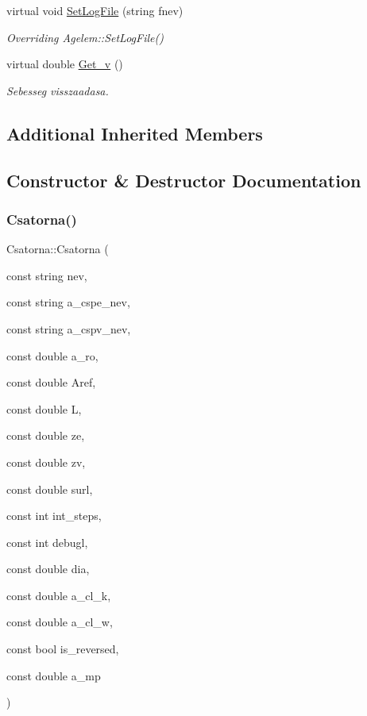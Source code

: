 \begin{DoxyCompactItemize}
virtual void \hyperlink{class_csatorna_a0b0b43ad04feb2e0cf60a6d027387ff9}{Set\+Log\+File} (string fnev)
\begin{DoxyCompactList}\small\item\em Overriding Agelem\+::\+Set\+Log\+File() \end{DoxyCompactList}\item 
\hypertarget{class_csatorna_a74db8402dcaaf02c408c1ac900a610f9}{}\label{class_csatorna_a74db8402dcaaf02c408c1ac900a610f9} 
virtual double \hyperlink{class_csatorna_a74db8402dcaaf02c408c1ac900a610f9}{Get\+\_\+v} ()
\begin{DoxyCompactList}\small\item\em Sebesseg visszaadasa. \end{DoxyCompactList}\end{DoxyCompactItemize}
\subsection*{Additional Inherited Members}


\subsection{Constructor \& Destructor Documentation}
\hypertarget{class_csatorna_ae3829a74761e0507363290fde29af12b}{}\label{class_csatorna_ae3829a74761e0507363290fde29af12b} 
\subsubsection{\texorpdfstring{Csatorna()}{Csatorna()}}
{\footnotesize\ttfamily Csatorna\+::\+Csatorna (\begin{DoxyParamCaption}\item[{const string}]{nev,  }\item[{const string}]{a\+\_\+cspe\+\_\+nev,  }\item[{const string}]{a\+\_\+cspv\+\_\+nev,  }\item[{const double}]{a\+\_\+ro,  }\item[{const double}]{Aref,  }\item[{const double}]{L,  }\item[{const double}]{ze,  }\item[{const double}]{zv,  }\item[{const double}]{surl,  }\item[{const int}]{int\+\_\+steps,  }\item[{const int}]{debugl,  }\item[{const double}]{dia,  }\item[{const double}]{a\+\_\+cl\+\_\+k,  }\item[{const double}]{a\+\_\+cl\+\_\+w,  }\item[{const bool}]{is\+\_\+reversed,  }\item[{const double}]{a\+\_\+mp }\end{DoxyParamCaption})}



